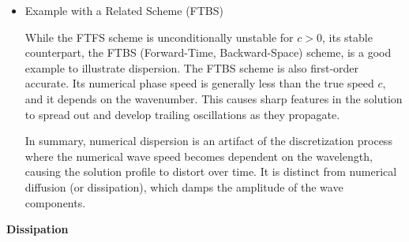 \documentclass[12pt,a4paper]{report}
\begin{document}
\begin{itemize}
\item  Example with a Related Scheme (FTBS)

While the FTFS scheme is unconditionally unstable for \(c>0\), its stable counterpart, the FTBS (Forward-Time, Backward-Space) scheme, is a good example to illustrate dispersion. The FTBS scheme is also first-order accurate. Its numerical phase speed is generally less than the true speed \(c\), and it depends on the wavenumber. This causes sharp features in the solution to spread out and develop trailing oscillations as they propagate.

In summary, numerical dispersion is an artifact of the discretization process where the numerical wave speed becomes dependent on the wavelength, causing the solution profile to distort over time. It is distinct from numerical diffusion (or dissipation), which damps the amplitude of the wave components.
\end{itemize}

\newpage
\begin{center}
	\textbf{\LARGE{Dissipation}}
\end{center}
\end{document}
